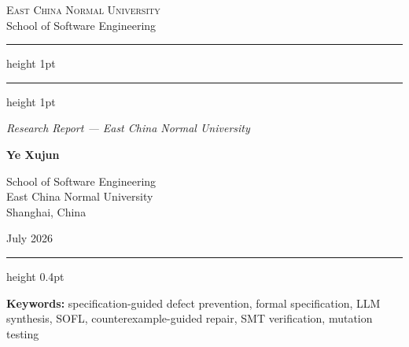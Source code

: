 \begin{titlepage}
\thispagestyle{empty}
\centering

\vspace*{2.5cm}

{\large\scshape East China Normal University}\\[0.5em]
{\normalsize School of Software Engineering}

\vspace{2cm}
\hrule height 1pt
\vspace{0.8cm}


\vspace{0.8cm}
\hrule height 1pt

\vspace{1.2cm}

{\large\itshape Research Report --- East China Normal University}

\vspace{2cm}

{\Large\bfseries Ye Xujun}

\vspace{0.8cm}

{\normalsize
School of Software Engineering\\
East China Normal University\\
Shanghai, China
}

\vspace{1.5cm}

{\large July 2026}

\vfill

\hrule height 0.4pt
\vspace{0.5cm}

{\small
\textbf{Keywords:}
specification-guided defect prevention,
formal specification,
LLM synthesis,
SOFL,
counterexample-guided repair,
SMT verification,
mutation testing
}

\end{titlepage}
